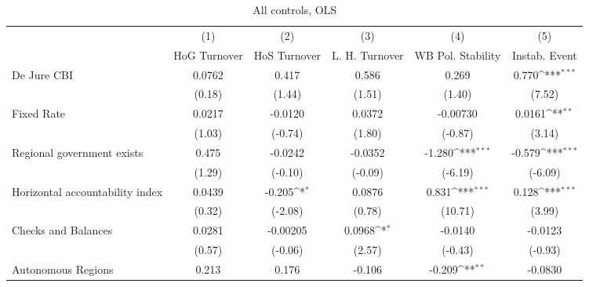 \begin{table}[htbp]\centering
\def\sym#1{\ifmmode^{#1}\else\(^{#1}\)\fi}
\caption{All controls, OLS \label{fullcmultIndOLSDJ}}
\begin{tabular}{l*{5}{c}}
\toprule
                                        &\multicolumn{1}{c}{(1)}&\multicolumn{1}{c}{(2)}&\multicolumn{1}{c}{(3)}&\multicolumn{1}{c}{(4)}&\multicolumn{1}{c}{(5)}\\
                                        &\multicolumn{1}{c}{HoG Turnover}&\multicolumn{1}{c}{HoS Turnover}&\multicolumn{1}{c}{L. H. Turnover}&\multicolumn{1}{c}{WB Pol. Stability}&\multicolumn{1}{c}{Instab. Event}\\
\midrule
De Jure CBI                             &   0.0762         &    0.417         &    0.586         &    0.269         &    0.770\sym{***}\\
                                        &   (0.18)         &   (1.44)         &   (1.51)         &   (1.40)         &   (7.52)         \\
\addlinespace
Fixed Rate                              &   0.0217         &  -0.0120         &   0.0372         & -0.00730         &   0.0161\sym{**} \\
                                        &   (1.03)         &  (-0.74)         &   (1.80)         &  (-0.87)         &   (3.14)         \\
\addlinespace
Regional government exists              &    0.475         &  -0.0242         &  -0.0352         &   -1.280\sym{***}&   -0.579\sym{***}\\
                                        &   (1.29)         &  (-0.10)         &  (-0.09)         &  (-6.19)         &  (-6.09)         \\
\addlinespace
Horizontal accountability index         &   0.0439         &   -0.205\sym{*}  &   0.0876         &    0.831\sym{***}&    0.128\sym{***}\\
                                        &   (0.32)         &  (-2.08)         &   (0.78)         &  (10.71)         &   (3.99)         \\
\addlinespace
Checks and Balances                     &   0.0281         & -0.00205         &   0.0968\sym{*}  &  -0.0140         &  -0.0123         \\
                                        &   (0.57)         &  (-0.06)         &   (2.57)         &  (-0.43)         &  (-0.93)         \\
\addlinespace
Autonomous Regions                      &    0.213         &    0.176         &   -0.106         &   -0.209\sym{**} &  -0.0830         \\

\end{tabular}
\end{table}
